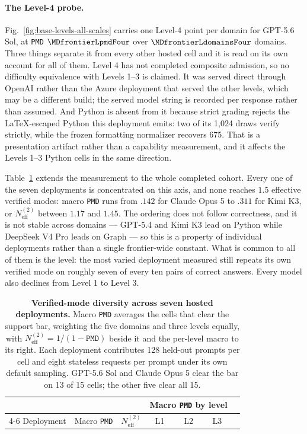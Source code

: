 \documentclass{article}
\newcommand{\1}{\mathbf 1}
\newcommand{\pmd}{\texttt{PMD}}
\newcommand{\neff}{\ensuremath{N^{(2)}_{\mathrm{eff}}}}
\theoremstyle{remark}
\theoremstyle{definition}
\theoremstyle{plain}
\begin{document}
\paragraph{The Level-4 probe.}
Fig.~\ref{fig:base-levels-all-scales} carries one Level-4 point per domain for
GPT-5.6 Sol, at \pmd{} $\MDfrontierLpmdFour$ over $\MDfrontierLdomainsFour$
domains. Three things separate it from every other hosted cell and it is read
on its own account for all of them. Level 4 has not completed composite
admission, so no difficulty equivalence with Levels 1--3 is claimed. It was
served direct through OpenAI rather than the Azure deployment that served the
other levels, which may be a different build; the served model string is
recorded per response rather than assumed. And Python is absent from it because
strict grading rejects the LaTeX-escaped Python this deployment emits: two of
its 1,024 draws verify strictly, while the frozen formatting normalizer
recovers 675. That is a presentation artifact rather than a capability
measurement, and it affects the Levels 1--3 Python cells in the same direction.

Table~\ref{tab:hosted-cohort-mode-diversity} extends the measurement to the
whole completed cohort. Every one of the seven deployments is concentrated on
this axis, and none reaches $1.5$ effective verified modes: macro \pmd{} runs
from $.142$ for Claude Opus 5 to $.311$ for Kimi K3, or $\neff$ between $1.17$
and $1.45$. The ordering does not follow correctness, and it is not stable
across domains --- GPT-5.4 and Kimi K3 lead on Python while DeepSeek V4 Pro
leads on Graph --- so this is a property of individual deployments rather than
a single frontier-wide constant. What is common to all of them is the level:
the most varied deployment measured still repeats its own verified mode on
roughly seven of every ten pairs of correct answers. Every model also declines
from Level 1 to Level 3.

\begin{table}[!htbp]
  \centering
  \caption{\textbf{Verified-mode diversity across seven hosted deployments.}
  Macro \pmd{} averages the cells that clear the support bar, weighting the
  five domains and three levels equally, with $\neff=1/(1-\pmd{})$ beside it
  and the per-level macro to its right. Each deployment contributes 128
  held-out prompts per cell and eight stateless requests per prompt under its
  own default sampling. GPT-5.6 Sol and Claude Opus 5 clear the bar on 13 of
  15 cells; the other five clear all 15.}
  \label{tab:hosted-cohort-mode-diversity}
  \small
  \begin{tabular}{lcccccc}
    \toprule
    & & & \multicolumn{3}{c}{Macro \pmd{} by level} \\
    \cmidrule(lr){4-6}
    Deployment & Macro \pmd{} & $\neff$ & L1 & L2 & L3 \\
    \midrule
    
  \end{tabular}
\end{table}
\end{document}
